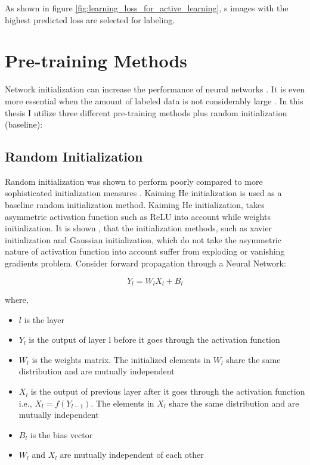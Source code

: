 As shown in figure \ref{fig:learning_loss_for_active_learning}, s images with the highest predicted loss are selected for labeling.

\section{Pre-training Methods}\label{section:pretraining_methods}
Network initialization can increase the performance of neural networks \cite{hanin2018}. It is even more essential when the amount of labeled data is not considerably large \cite{holmberg2020}. In this thesis I utilize three different pre-training methods plus random initialization (baseline):

\subsection{Random Initialization}
Random initialization was shown to perform poorly compared to more sophisticated initialization measures \cite{glorot2010}. Kaiming He initialization \cite{he2015} is used as a baseline random initialization method. Kaiming He initialization, takes asymmetric activation function such as ReLU into account while weights initialization. It is shown \cite{he2015}, that the initialization methods, such as xavier initialization \cite{glorot2010} and Gaussian initialization, which do not take the asymmetric nature of activation function into account suffer from exploding or vanishing gradients problem. Consider forward propagation through a Neural Network:

\begin{equation}
    \label{equation:forward_pass}
    Y_l = W_lX_l + B_l
\end{equation}

where,
\begin{itemize}[label={}]
  \setlength\itemsep{0em}
  \item $l$ is the layer
  \item $Y_l$ is the output of layer l before it goes through the activation function
  \item $W_l$ is the weights matrix. The initialized elements in $W_l$ share the same distribution and are mutually independent
  \item $X_l$ is the output of previous layer after it goes through the activation function i.e., $X_l = f(Y_{l-1})$. The elements in $X_l$ share the same distribution and are mutually independent
  \item $B_l$ is the bias vector
  \item $W_l$ and $X_l$ are mutually independent of each other
\end{itemize}

